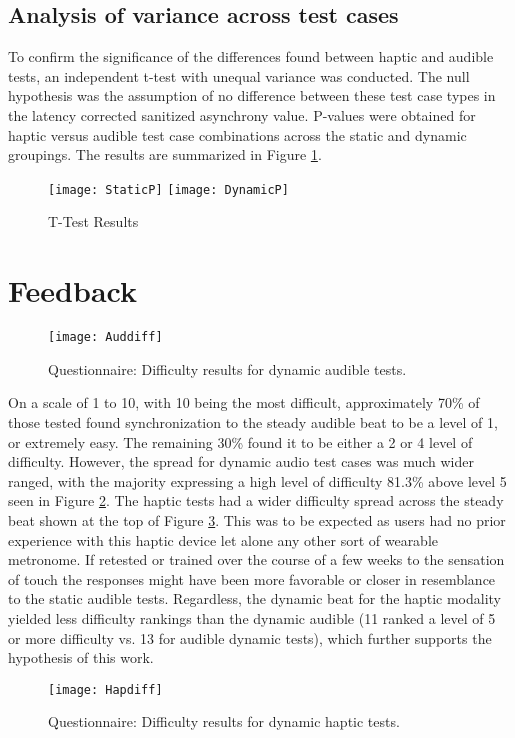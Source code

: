 \subsection{Analysis of variance across test cases}

To confirm the significance of the differences found between haptic and audible tests, an independent t-test with unequal variance was conducted. The null hypothesis was the assumption of no difference between these test case types in the latency corrected sanitized asynchrony value. P-values were obtained for haptic versus audible test case combinations across the static and dynamic groupings. The results are summarized in Figure \ref{fig:pvalue}.

\begin{figure}[H]
    \centering
    \texttt{[image: StaticP]}
    \texttt{[image: DynamicP]}
    \caption{T-Test Results}
    \label{fig:pvalue}
\end{figure}
\pagebreak
\section{Feedback}
\begin{figure}[H]
    \centering
    \texttt{[image: Auddiff]}
    \caption{Questionnaire: Difficulty results for dynamic audible tests.}
    \label{fig:Auddiff}
\end{figure}
On a scale of 1 to 10, with 10 being the most difficult, approximately 70\% of those tested found synchronization to the steady audible beat to be a level of 1, or extremely easy. The remaining 30\% found it to be either a 2 or 4 level of difficulty. However, the spread for dynamic audio test cases was much wider ranged, with the majority expressing a high level of difficulty 81.3\% above level 5 seen in Figure \ref{fig:Auddiff}. The haptic tests had a wider difficulty spread across the steady beat shown at the top of Figure \ref{fig:Hapdiff}. This was to be expected as users had no prior experience with this haptic device let alone any other sort of wearable metronome. If retested or trained over the course of a few weeks to the sensation of touch the responses might have been more favorable or closer in resemblance to the static audible tests. Regardless, the dynamic beat for the haptic modality yielded less difficulty rankings than the dynamic audible (11 ranked a level of 5 or more difficulty vs. 13 for audible dynamic tests), which further supports the hypothesis of this work.
\begin{figure}[H]
    \centering
    \texttt{[image: Hapdiff]}
    \caption{Questionnaire: Difficulty results for dynamic haptic tests.}
    \label{fig:Hapdiff}
\end{figure}

